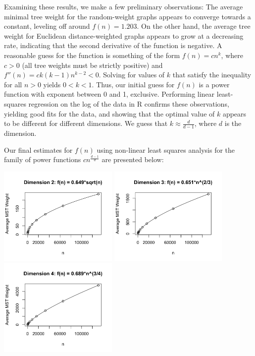 \documentclass[a4paper]{article}
\begin{document}
Examining these results, we make a few preliminary observations: The average minimal tree weight for the random-weight graphs appears to converge towards a constant, leveling off around $f(n) = 1.203$. On the other hand, the average tree weight for Euclidean distance-weighted graphs appears to grow at a decreasing rate, indicating that the second derivative of the function is negative. A reasonable guess for the function is something of the form $f(n) = cn^k$, where $c>0$ (all tree weights must be strictly positive) and $f''(n) = ck(k-1)n^{k-2} < 0$. Solving for values of $k$ that satisfy the inequality for all $n>0$ yields $0<k<1$. Thus, our initial guess for $f(n)$ is a power function with exponent between 0 and 1, exclusive. Performing linear least-squares regression on the log of the data in R confirms these observations, yielding good fits for the data, and showing that the optimal value of $k$ appears to be different for different dimensions. We guess that $k\approx \frac{d}{d-1}$, where $d$ is the dimension.

Our final estimates for $f(n)$ using non-linear least squares analysis for the family of power functions $cn^{\frac{d-1}{d}}$ are presented below:

\includegraphics[width=2.27in]{dim2plot}
\includegraphics[width=2.27in]{dim3plot}
\includegraphics[width=2.27in]{dim4plot}
\end{document}
